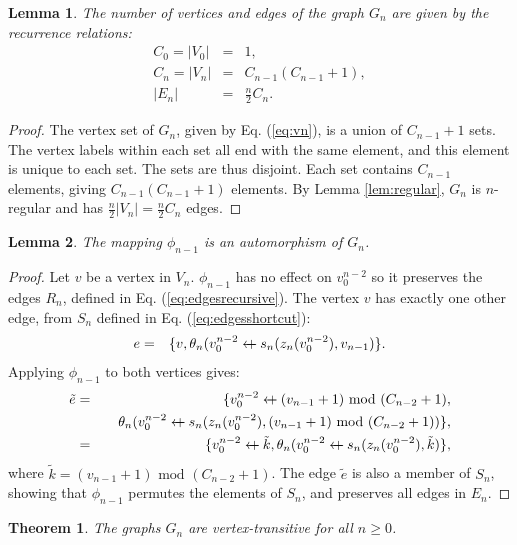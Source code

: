 \documentclass{article}
\newcommand{\beq}{\begin{eqnarray}}
\newcommand{\eeq}{\end{eqnarray}}
\newcommand{\append}{\leftarrow{\mkern-18mu}{+}\:}
\newtheorem{lemma}{Lemma}
\newtheorem{theorem}{Theorem}
\begin{document}
\begin{lemma}
The number of vertices and edges of the graph $G_n$ are given by the recurrence
relations:
\beq
C_0 = |V_0| &=& 1, \\
\label{eq:cnrec}C_{n} = |V_{n}| &=& C_{n-1} (C_{n-1} + 1), \\
|E_n| &=& \frac{n}{2} C_n.
\eeq
\end{lemma}
\begin{proof}
The vertex set of $G_n$, given by Eq. (\ref{eq:vn}), is a union of
$C_{n-1} + 1$ sets.
The vertex labels within each set all end with the same element,
and this element is unique to each set.
The sets are thus disjoint.
Each set contains $C_{n-1}$ elements, giving $C_{n-1}(C_{n-1} + 1)$
elements.
By Lemma \ref{lem:regular}, $G_n$ is $n$-regular and has
$\frac{n}{2}|V_n| = \frac{n}{2}C_n$ edges.
\end{proof}
\begin{lemma}
\label{lem:phiauto}
The mapping $\phi_{n-1}$ is an automorphism of $G_n$.
\end{lemma}
\begin{proof}
Let $v$ be a vertex in $V_n$.
$\phi_{n-1}$ has no effect on $v_0^{n-2}$ so it preserves the edges $R_n$,
defined in Eq. (\ref{eq:edgesrecursive}).
The vertex $v$ has exactly one other edge, from $S_n$ defined in
Eq. (\ref{eq:edgesshortcut}):
\beq
e &=& \{ v, \theta_n(v_0^{n-2} \append s_n(z_n(v_0^{n-2}), v_{n-1}) \}.
\eeq
Applying $\phi_{n-1}$ to both vertices gives:
\beq
\tilde{e} &=&
\{ v_0^{n-2} \append (v_{n-1} + 1) \mbox{ mod } (C_{n-2} + 1), \\
&& \quad \theta_n(v_0^{n-2} \append
s_n(z_n(v_0^{n-2}), (v_{n-1} + 1) \mbox{ mod } (C_{n-2} + 1) ) \},
\\
&=&
\{ v_0^{n-2} \append \tilde{k},
\theta_n(v_0^{n-2} \append s_n(z_n(v_0^{n-2}), \tilde{k}) \},
\eeq
where $\tilde{k} = (v_{n-1} + 1) \mbox{ mod } (C_{n-2} + 1)$.
The edge $\tilde{e}$ is also a member of $S_n$,
showing that $\phi_{n-1}$ permutes the elements of $S_n$,
and preserves all edges in $E_n$.
\end{proof}
\begin{theorem}
The graphs $G_n$ are vertex-transitive for all $n \geq 0$.
\end{theorem}
\end{document}
